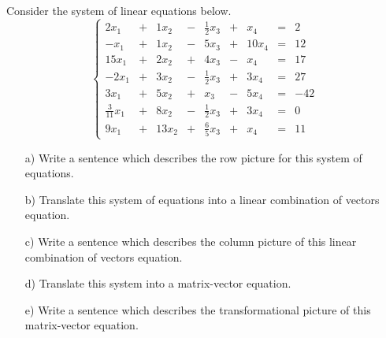 \documentclass[cahier-main.tex]{subfiles}
\begin{document}
\begin{task}
Consider the system of linear equations below.
\[
\left\{\begin{array}{rrrrrrrrr}
2x_1 & + & 1x_2 & - & \frac{1}{2}x_3 & + & x_4 & = & 2 \\
-x_1 & + & 1x_2 & - & 5x_3 & + & 10x_4 & = & 12 \\
15x_1 & + & 2x_2 & + & 4x_3 & - & x_4 & = & 17 \\
-2x_1 & + & 3x_2 & - & \frac{1}{2}x_3 & + & 3x_4 & = & 27 \\
3x_1 & + & 5x_2 & + & x_3 & - & 5x_4 & = & -42 \\
\frac{3}{11}x_1 & + & 8x_2 & - & \frac{1}{2}x_3 & + & 3x_4 & = & 0 \\
9x_1 & + & 13x_2 & + & \frac{6}{5}x_3 & + & x_4 & = & 11 
\end{array}\right .
\]
\begin{itemize}
\item[a)] Write a sentence which describes the row picture for this system of equations.

\item[b)] Translate this system of equations into a linear combination of vectors equation. 
\item[c)] Write a sentence which describes the column picture of this linear combination of vectors equation.
\item[d)] Translate this system into a matrix-vector equation.
\item[e)] Write a sentence which describes the transformational picture of this matrix-vector equation.
\end{itemize}
\end{task}
\end{document}
